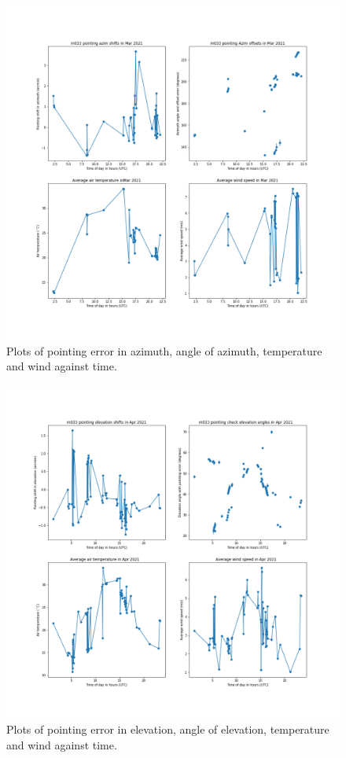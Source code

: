 \documentclass{article}
\begin{document}
\begin{figure}[H]
	\centering
	\includegraphics[scale=0.45]{m033_azim_Mar_mapped.png}
	
	\caption{Plots of pointing error in azimuth, angle of azimuth, temperature and wind against time.}
	\label{fig:m033AzimMarMapped}
\end{figure}


\begin{figure}[H]
	\centering
	\includegraphics[scale=0.45]{m033_elev_Apr_mapped.png}
	
	\caption{Plots of pointing error in elevation, angle of elevation, temperature and wind against time.}
	\label{fig:m033ElevAprMapped}
\end{figure}
\end{document}
